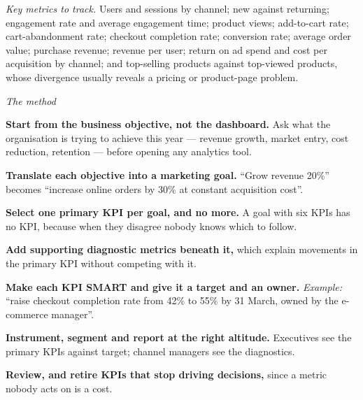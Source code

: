 \begin{qlist}
\textit{Key metrics to track.} Users and sessions by channel; new against
returning; engagement rate and average engagement time; product views;
add-to-cart rate; cart-abandonment rate; checkout completion rate; conversion
rate; average order value; purchase revenue; revenue per user; return on ad
spend and cost per acquisition by channel; and top-selling products against
top-viewed products, whose divergence usually reveals a pricing or
product-page problem.

\textit{The method}
\begin{apts}
\item \textbf{Start from the business objective, not the dashboard.} Ask what
      the organisation is trying to achieve this year --- revenue growth, market
      entry, cost reduction, retention --- before opening any analytics tool.
\item \textbf{Translate each objective into a marketing goal.} ``Grow revenue
      20\%'' becomes ``increase online orders by 30\% at constant acquisition
      cost''.
\item \textbf{Select one primary KPI per goal, and no more.} A goal with six
      KPIs has no KPI, because when they disagree nobody knows which to follow.
\item \textbf{Add supporting diagnostic metrics beneath it,} which explain
      movements in the primary KPI without competing with it.
\item \textbf{Make each KPI SMART and give it a target and an owner.}
      \emph{Example:} ``raise checkout completion rate from 42\% to 55\% by
      31 March, owned by the e-commerce manager''.
\item \textbf{Instrument, segment and report at the right altitude.} Executives
      see the primary KPIs against target; channel managers see the diagnostics.
\item \textbf{Review, and retire KPIs that stop driving decisions,} since a
      metric nobody acts on is a cost.
\end{apts}


\end{qlist}
